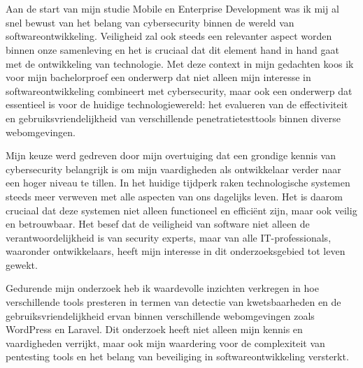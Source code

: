 
\chapter*{}%
\label{ch:voorwoord}


Aan de start van mijn studie Mobile en Enterprise Development was ik mij al snel bewust van het belang van cybersecurity binnen de wereld van softwareontwikkeling. 
Veiligheid zal ook steeds een relevanter aspect worden binnen onze samenleving en het is cruciaal dat dit element hand in hand gaat met de ontwikkeling van technologie. 
Met deze context in mijn gedachten koos ik voor mijn bachelorproef een onderwerp dat niet alleen mijn interesse in softwareontwikkeling combineert met cybersecurity, 
maar ook een onderwerp dat essentieel is voor de huidige technologiewereld: het evalueren van de effectiviteit en gebruiksvriendelijkheid van verschillende 
penetratietesttools binnen diverse webomgevingen.

Mijn keuze werd gedreven door mijn overtuiging dat een grondige kennis van cybersecurity belangrijk is om mijn vaardigheden als ontwikkelaar verder naar een hoger niveau te tillen. In het huidige 
tijdperk raken technologische systemen steeds meer verweven met alle aspecten van ons dagelijks leven. Het is daarom cruciaal dat deze systemen niet alleen 
functioneel en efficiënt zijn, maar ook veilig en betrouwbaar. Het besef dat de veiligheid van software niet alleen de verantwoordelijkheid 
is van security experts, maar van alle IT-professionals, waaronder ontwikkelaars, heeft mijn interesse in dit onderzoeksgebied tot leven gewekt.

Gedurende mijn onderzoek heb ik waardevolle inzichten verkregen in hoe verschillende tools presteren in termen van detectie van kwetsbaarheden en de 
gebruiksvriendelijkheid ervan binnen verschillende webomgevingen zoals WordPress en Laravel. Dit onderzoek heeft niet alleen mijn kennis en vaardigheden 
verrijkt, maar ook mijn waardering voor de complexiteit van pentesting tools en het belang van beveiliging in softwareontwikkeling versterkt.


